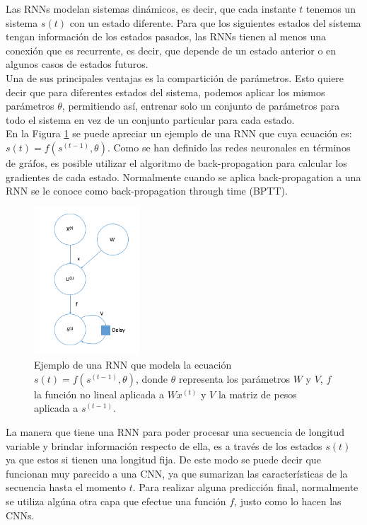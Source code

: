 Las RNNs modelan sistemas dinámicos, es decir, que cada instante $t$ tenemos un sistema $s(t)$ con un estado diferente. Para que los siguientes estados del sistema tengan información de los estados pasados, las RNNs tienen al menos una conexión que es recurrente, es decir, que depende de un estado anterior o en algunos casos de estados futuros. \\

Una de sus principales ventajas es la compartición de parámetros. Esto quiere decir que para diferentes estados del sistema, podemos aplicar los mismos parámetros $\theta$, permitiendo así, entrenar solo un conjunto de parámetros para todo el sistema en vez de un conjunto particular para cada estado. \\

En la Figura \ref{fig:rnn} se puede apreciar un ejemplo de una RNN que cuya ecuación es: $s(t) = f(s^{(t-1)}, \theta)$. Como se han definido las redes neuronales en términos de gráfos, es posible utilizar el algoritmo de back-propagation para calcular los gradientes de cada estado. Normalmente cuando se aplica back-propagation a una RNN se le conoce como back-propagation through time (BPTT). \\

\begin{figure}[H]
	\centering
	\includegraphics[width=4cm, height=5.5cm]{capitulo2/images/rnn}
	\caption{Ejemplo de una RNN que modela la ecuación $s(t) = f(s^{(t-1)}, \theta)$, donde $\theta$ representa los parámetros $W$ y $V$, $f$ la función no lineal aplicada a $Wx^{(t)}$ y $V$ la matriz de pesos aplicada a $s^{(t-1)}$.}
	\label{fig:rnn}
\end{figure}

La manera que tiene una RNN para poder procesar una secuencia de longitud variable y brindar información respecto de ella, es a través de los estados $s(t)$ ya que estos si tienen una longitud fija. De este modo se puede decir que funcionan muy parecido a una CNN, ya que sumarizan las características de la secuencia hasta el momento $t$. Para realizar alguna predicción final, normalmente se utiliza algúna otra capa que efectue una función $f$, justo como lo hacen las CNNs. \\
  
